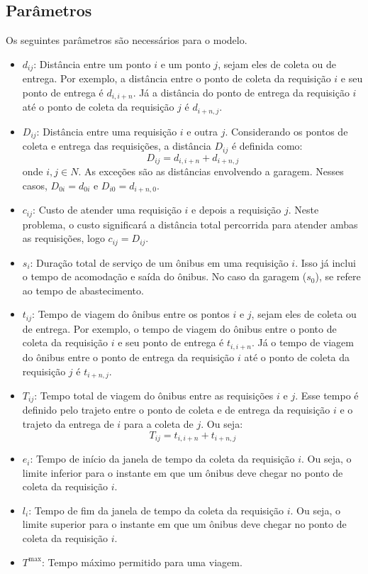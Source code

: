 \documentclass[12pt, a4paper]{article}
\begin{document}
\subsection{Parâmetros}

Os seguintes parâmetros são necessários para o modelo.

\begin{itemize}
    \item $d_{ij}$: Distância entre um ponto $i$ e um ponto $j$, sejam eles de coleta ou de entrega. Por exemplo, a distância entre o ponto de coleta da requisição $i$ e seu ponto de entrega é $d_{i, i+n}$. Já a distância do ponto de entrega da requisição $i$ até o ponto de coleta da requisição $j$ é $d_{i+n, j}$.
    \item $D_{ij}$: Distância entre uma requisição $i$ e outra $j$. Considerando os pontos de coleta e entrega das requisições, a distância $D_{ij}$ é definida como: $$ D_{ij} = d_{i, i+n} + d_{i+n, j} $$ onde $i, j \in N$. As exceções são as distâncias envolvendo a garagem. Nesses casos, $D_{0i} = d_{0i}$ e $D_{i0} = d_{i+n, 0}$.
    \item $c_{ij}$: Custo de atender uma requisição $i$ e depois a requisição $j$. Neste problema, o custo significará a distância total percorrida para atender ambas as requisições, logo $c_{ij} = D_{ij}$.
    \item $s_i$: Duração total de serviço de um ônibus em uma requisição $i$. Isso já inclui o tempo de acomodação e saída do ônibus. No caso da garagem ($s_0$), se refere ao tempo de abastecimento.
    \item $t_{ij}$: Tempo de viagem do ônibus entre os pontos $i$ e $j$, sejam eles de coleta ou de entrega. Por exemplo, o tempo de viagem do ônibus entre o ponto de coleta da requisição $i$ e seu ponto de entrega é $t_{i, i+n}$. Já o tempo de viagem do ônibus entre o ponto de entrega da requisição $i$ até o ponto de coleta da requisição $j$ é $t_{i+n, j}$.
    \item $T_{ij}$: Tempo total de viagem do ônibus entre as requisições $i$ e $j$. Esse tempo é definido pelo trajeto entre o ponto de coleta e de entrega da requisição $i$ e o trajeto da entrega de $i$ para a coleta de $j$. Ou seja: $$T_{ij} = t_{i, i+n} + t_{i+n, j}$$
    \item $e_i$: Tempo de início da janela de tempo da coleta da requisição $i$. Ou seja, o limite inferior para o instante em que um ônibus deve chegar no ponto de coleta da requisição $i$.
    \item $l_i$: Tempo de fim da janela de tempo da coleta da requisição $i$. Ou seja, o limite superior para o instante em que um ônibus deve chegar no ponto de coleta da requisição $i$.
    \item $T^{\max}$: Tempo máximo permitido para uma viagem.
\end{itemize}
\end{document}
